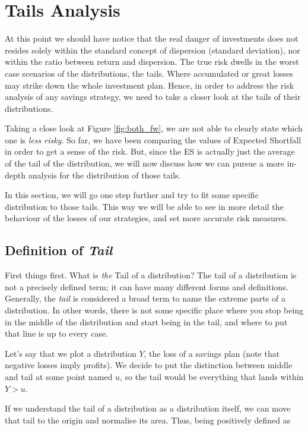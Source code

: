 \section{Tails Analysis}

At this point we should have notice that the real danger of investments does not resides solely within the standard concept of dispersion (standard deviation), nor within the ratio between return and dispersion. The true risk dwells in the worst case scenarios of the distributions, the tails. Where accumulated or great losses may strike down the whole investment plan. Hence, in order to address the risk analysis of any savings strategy, we need to take a closer look at the tails of their distributions. 


Taking a close look at Figure \ref{fig:both_fw}, we are not able to clearly state which one is \textit{less risky}. So far, we have been comparing the values of Expected Shortfall in order to get a sense of the risk. But, since the ES is actually just the average of the tail of the distribution, we will now discuss how we can pursue a more in-depth analysis for the distribution of those tails.

In this section, we will go one step further and try to fit some specific distribution to those tails. This way we will be able to see in more detail the behaviour of the losses of our strategies, and set more accurate risk measures.

\subsection{Definition of \textit{Tail}}

First things first. What is \emph{the} Tail of a distribution? The tail of a distribution is not a precisely defined term; it can have many different forms and definitions. Generally, the \textit{tail} is considered a broad term to name the extreme parts of a distribution. In other words, there is not some specific place where you stop being in the middle of the distribution and start being in the tail, and where to put that line is up to every case.

Let's say that we plot a distribution $Y$, the loss of a savings plan (note that negative losses imply profits). We decide to put the distinction between middle and tail at some point named $u$, so the tail would be everything that lands within $Y>u$.

If we understand the tail of a distribution as a distribution itself, we can move that tail to the origin and normalise its area. Thus, being positively defined as

